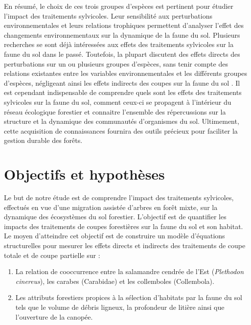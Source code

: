 En résumé, le choix de ces trois groupes d'espèces est pertinent pour étudier l'impact des traitements sylvicoles. 
Leur sensibilité aux perturbations environnementales et leurs relations trophiques permettent d'analyser l'effet des changements environnementaux sur la dynamique de la faune du sol.
Plusieurs recherches se sont déjà intéressées aux effets des traitements sylvicoles sur la faune du sol dans le passé. 
Toutefois, la plupart discutent des effets directs des perturbations sur un ou plusieurs groupes d'espèces, 
sans tenir compte des relations existantes entre les variables environnementales et les différents groupes d'espèces, 
négligeant ainsi les effets indirects des coupes sur la faune du sol \citep{josephIntegratingOccupancyModels2016,Kudrin2023metaanalysiseffects,Pollierer2021Diversityfunctional}. 
Il est cependant indispensable de comprendre quels sont les effets des traitements sylvicoles sur la faune du sol, 
comment ceux-ci se propagent à l'intérieur du réseau écologique forestier et connaitre l'ensemble des répercussions sur la structure 
et la dynamique des communautés d'organismes du sol. 
Ultimement, cette acquisition de connaissances fournira des outils précieux pour faciliter la gestion durable des forêts.


\section*{Objectifs et hypothèses}
\label{sec:objectifs}

Le but de notre étude est de comprendre l'impact des traitements sylvicoles, effectués en vue d'une migration assistée d'arbres en forêt mixte, sur la dynamique des écosystèmes du sol forestier.
L'objectif est de quantifier les impacts des traitements de coupes forestières sur la faune du sol et son habitat. 
Le moyen d'atteindre cet objectif est de construire un modèle d'équations structurelles pour mesurer les effets directs et indirects des traitements de coupe totale et de coupe partielle sur : 

\begin{enumerate}
    \item La relation de cooccurrence entre la salamandre cendrée de l'Est (\textit{Plethodon cinereus}), les carabes (Carabidae) et les collemboles (Collembola).
    \item Les attributs forestiers propices à la sélection d'habitats par la faune du sol tels que le volume de débris ligneux, la profondeur de litière ainsi que l'ouverture de la canopée. 
\end{enumerate}

